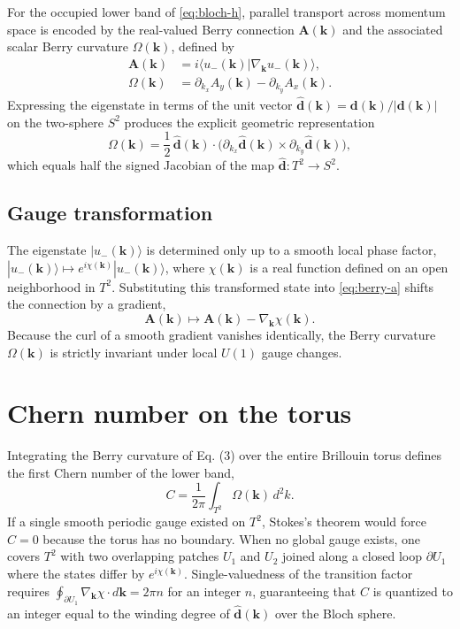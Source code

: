 \documentclass{article}
\begin{document}
For the occupied lower band of \eqref{eq:bloch-h}, parallel transport across
momentum space is encoded by the real-valued Berry connection $\mathbf{A}(\mathbf{k})$
and the associated scalar Berry curvature $\Omega(\mathbf{k})$, defined by
\begin{align}
  \mathbf{A}(\mathbf{k}) &= i \langle u_{-}(\mathbf{k}) | \nabla_{\mathbf{k}} u_{-}(\mathbf{k}) \rangle, \label{eq:berry-a} \\
  \Omega(\mathbf{k}) &= \partial_{k_x} A_y(\mathbf{k}) - \partial_{k_y} A_x(\mathbf{k}). \label{eq:berry-f}
\end{align}
Expressing the eigenstate in terms of the unit vector
$\hat{\mathbf{d}}(\mathbf{k}) = \mathbf{d}(\mathbf{k}) / |\mathbf{d}(\mathbf{k})|$
on the two-sphere $S^2$ produces the explicit geometric representation
\[
  \Omega(\mathbf{k}) = \frac{1}{2}\,\hat{\mathbf{d}}(\mathbf{k}) \cdot
  \bigl(\partial_{k_x} \hat{\mathbf{d}}(\mathbf{k}) \times \partial_{k_y} \hat{\mathbf{d}}(\mathbf{k})\bigr),
\]
which equals half the signed Jacobian of the map $\hat{\mathbf{d}} : T^2 \to S^2$.

\subsection{Gauge transformation}\label{subsec:gauge}

The eigenstate $|u_{-}(\mathbf{k})\rangle$ is determined only up to a smooth local
phase factor, $|u_{-}(\mathbf{k})\rangle \mapsto e^{i\chi(\mathbf{k})} |u_{-}(\mathbf{k})\rangle$,
where $\chi(\mathbf{k})$ is a real function defined on an open neighborhood in
$T^2$. Substituting this transformed state into \eqref{eq:berry-a} shifts the
connection by a gradient,
\[
  \mathbf{A}(\mathbf{k}) \mapsto \mathbf{A}(\mathbf{k}) - \nabla_{\mathbf{k}} \chi(\mathbf{k}).
\]
Because the curl of a smooth gradient vanishes identically, the Berry curvature
$\Omega(\mathbf{k})$ is strictly invariant under local $U(1)$ gauge changes.

\section{Chern number on the torus}\label{sec:chern}

Integrating the Berry curvature of Eq. (3) over the entire Brillouin torus defines
the first Chern number of the lower band,
\begin{equation}\label{eq:chern-int}
  C = \frac{1}{2\pi} \int_{T^2} \Omega(\mathbf{k})\,d^2 k.
\end{equation}
If a single smooth periodic gauge existed on $T^2$, Stokes's theorem would force
$C = 0$ because the torus has no boundary. When no global gauge exists, one covers
$T^2$ with two overlapping patches $U_1$ and $U_2$ joined along a closed loop
$\partial U_1$ where the states differ by $e^{i\chi(\mathbf{k})}$. Single-valuedness
of the transition factor requires $\oint_{\partial U_1} \nabla_{\mathbf{k}}\chi \cdot d\mathbf{k} = 2\pi n$
for an integer $n$, guaranteeing that $C$ is quantized to an integer equal to the
winding degree of $\hat{\mathbf{d}}(\mathbf{k})$ over the Bloch sphere.
\end{document}
